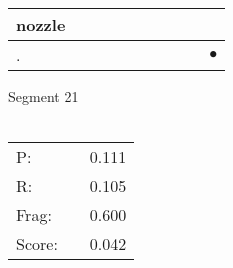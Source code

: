 \documentclass[landscape]{article}
\newcommand{\ssp}{\hspace{2pt}}
\newcommand{\mex}{\cellcolor{g}$\bullet$}
\begin{document}
\begin{tabular}{|l|p{10pt}|p{10pt}|p{10pt}|p{10pt}|p{10pt}|p{10pt}|p{10pt}|p{10pt}|p{10pt}|}
\hline
\ssp nozzle \ssp&\hspace{2pt}&\hspace{2pt}&\hspace{2pt}&\hspace{2pt}&\hspace{2pt}&\hspace{2pt}&\hspace{2pt}&\hspace{2pt}&\hspace{2pt}\\
\hline
\ssp \cellcolor{ref8}. \ssp&\hspace{2pt}&\hspace{2pt}&\hspace{2pt}&\hspace{2pt}&\hspace{2pt}&\hspace{2pt}&\hspace{2pt}&\hspace{2pt}&\hspace{2pt}\mex\\
\hline
\end{tabular}

\vspace{6pt}
\noindent Segment 21\\\\
\noindent\begin{tabular}{lm{12pt}r}
\hline
P:&&0.111\\
R:&&0.105\\
Frag:&&0.600\\
Score:&&0.042\\
\end{tabular}

\newpage
\end{document}
